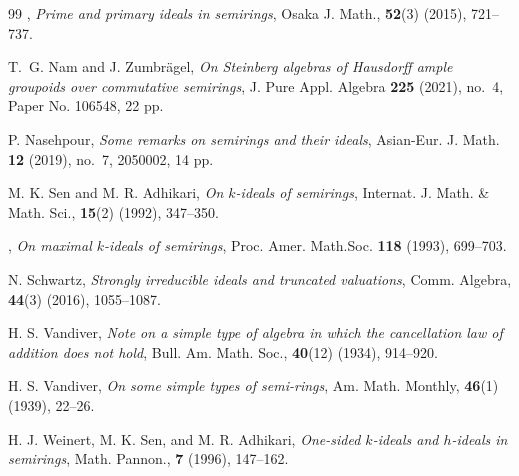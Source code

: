 \documentclass[11pt,leqno]{amsart}
\theoremstyle{definition}
\numberwithin{equation}{section}
\begin{document}
\begin{thebibliography}{99}
 \bysame, \textit{Prime and primary ideals in semirings}, Osaka J. Math., \textbf{52}(3) (2015), 721--737.



 T.~G. Nam and J. Zumbr\"agel, \textit{On Steinberg algebras of Hausdorff ample groupoids over commutative semirings}, J. Pure Appl. Algebra {\bf 225} (2021), no.~4, Paper No. 106548, 22 pp.


 P. Nasehpour, \textit{Some remarks on semirings and their ideals}, Asian-Eur. J. Math. {\bf 12} (2019), no.~7, 2050002, 14 pp.
    
 M. K. Sen and M. R. Adhikari, \textit{On $k$-ideals of semirings}, Internat. J. Math. \& Math. Sci., \textbf{15}(2) (1992), 347--350.
	
 \bysame, \textit{On maximal $k$-ideals of semirings}, Proc. Amer. Math.Soc. \textbf{118} (1993), 699--703.
	
 N. Schwartz, \textit{Strongly irreducible ideals and truncated valuations}, Comm. Algebra, \textbf{44}(3) (2016), 1055--1087.  
	
 H. S. Vandiver, \textit{Note on a simple type of algebra in which the cancellation law of addition does not hold}, Bull. Am. Math. Soc., \textbf{40}(12) (1934), 914--920.
	
 H. S. Vandiver, \textit{On some simple types of semi-rings}, Am. Math. Monthly, \textbf{46}(1) (1939), 22--26.
	
 H. J. Weinert, M. K. Sen, and M. R. Adhikari, \textit{One-sided $k$-ideals and $h$-ideals in semirings}, Math. Pannon., \textbf{7} (1996), 147--162.












\end{thebibliography}
\end{document}
